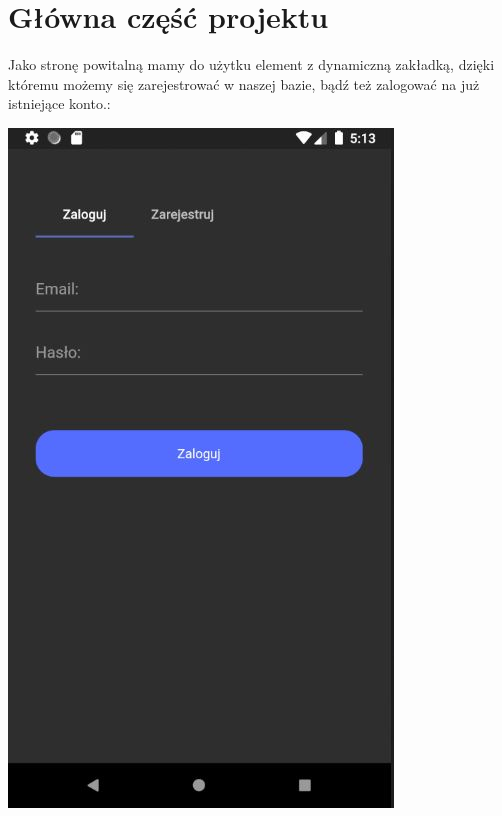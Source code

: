 \documentclass[12pt,a4paper]{article}
\begin{document}
	\section{Główna część projektu}
Jako stronę powitalną mamy do użytku element z dynamiczną zakładką, dzięki któremu możemy się zarejestrować w naszej bazie, bądź też zalogować na już istniejące konto.: \\
    \begin{center}
        \includegraphics[scale=0.70]{1.JPG}

\end{center}
\end{document}
